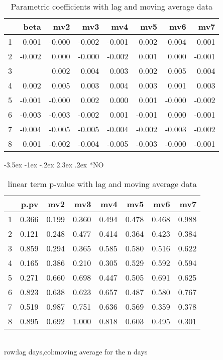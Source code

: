 \documentclass[a4paper, 12pt]{article}
\makeatletter
\def\large{\fontsize{14}{20}\selectfont}
\renewcommand\subsection{\@startsection {subsection}{1}{\z@}%
                                   {-3.5ex \@plus -1ex \@minus -.2ex}%
                                   {2.3ex \@plus.2ex}%
                                   {\centering\normalfont\large\bfseries}}
\makeatother
\begin{document}
\begin{table}[h]
\centering
\caption{Parametric coefficients with lag and moving average data}
\begin{tabular}{rrrrrrrr}
  \hline
 & beta & mv2 & mv3 & mv4 & mv5 & mv6 & mv7 \\
  \hline
1 & 0.001 & -0.000 & -0.002 & -0.001 & -0.002 & -0.004 & -0.001 \\
  2 & -0.002 & 0.000 & -0.000 & -0.002 & 0.001 & 0.000 & -0.001 \\
  3 & \color{red}{0.004} & 0.002 & 0.004 & 0.003 & 0.002 & 0.005 & 0.004 \\
  4 & 0.002 & 0.005 & 0.003 & 0.004 & 0.003 & 0.001 & 0.003 \\
  5 & -0.001 & -0.000 & 0.002 & 0.000 & 0.001 & -0.000 & -0.002 \\
  6 & -0.003 & -0.003 & -0.002 & 0.001 & -0.001 & 0.000 & -0.001 \\
  7 & -0.004 & -0.005 & -0.005 & -0.004 & -0.002 & -0.003 & -0.002 \\
  8 & 0.001 & -0.002 & -0.004 & -0.005 & -0.003 & -0.000 & -0.001 \\
   \hline
\end{tabular}
\end{table}
\clearpage
\subsection*{NO}
\begin{table}[h]
\centering
\caption{linear term p-value with lag and moving average data}
\begin{tabular}{rrrrrrrr}
  \hline
 & p.pv & mv2 & mv3 & mv4 & mv5 & mv6 & mv7 \\
  \hline
1 & 0.366 & 0.199 & 0.360 & 0.494 & 0.478 & 0.468 & 0.988 \\
  2 & 0.121 & 0.248 & 0.477 & 0.414 & 0.364 & 0.423 & 0.384 \\
  3 & 0.859 & 0.294 & 0.365 & 0.585 & 0.580 & 0.516 & 0.622 \\
  4 & 0.165 & 0.386 & 0.210 & 0.305 & 0.529 & 0.592 & 0.594 \\
  5 & 0.271 & 0.660 & 0.698 & 0.447 & 0.505 & 0.691 & 0.625 \\
  6 & 0.823 & 0.638 & 0.623 & 0.657 & 0.487 & 0.580 & 0.767 \\
  7 & 0.519 & 0.987 & 0.751 & 0.636 & 0.569 & 0.359 & 0.378 \\
  8 & 0.895 & 0.692 & 1.000 & 0.818 & 0.603 & 0.495 & 0.301 \\
   \hline
\end{tabular}
\\row:lag days,col:moving average for the n days
\end{table}
\end{document}
